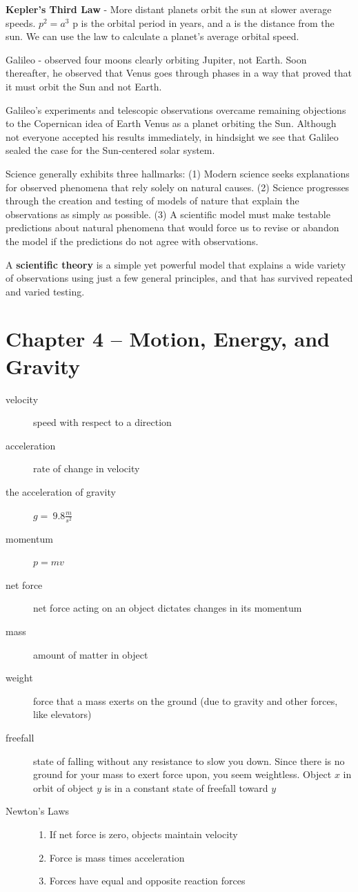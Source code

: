 \documentclass[12pt]{article}
\begin{document}
{\bf Kepler's Third Law} - More distant planets orbit the sun at slower average speeds. {\bf $p^2 = a^3$} p is the orbital period in years, and a is the distance from the sun. We can use the law to calculate a planet’s average orbital speed.

Galileo - observed four moons clearly orbiting Jupiter, not Earth. Soon thereafter, he observed that Venus goes through phases in a way that proved that it must orbit the Sun and not Earth.

Galileo’s experiments and telescopic observations overcame remaining objections to the Copernican idea of Earth
Venus as a planet orbiting the Sun. Although not everyone accepted his results immediately, in hindsight we see that
Galileo sealed the case for the Sun-centered solar system.

Science generally exhibits three hallmarks: (1) Modern science seeks explanations for observed phenomena that rely solely on natural causes. (2) Science progresses through the creation and testing of models of nature that explain the observations as simply as possible. (3) A scientific model must make testable predictions about natural phenomena that would force us to revise or abandon the model if the predictions do not agree with observations.

A {\bf scientific theory} is a simple yet powerful model that explains a wide variety of observations using just a few
general principles, and that has survived repeated and varied testing.

\section{Chapter 4 -- Motion, Energy, and Gravity}
\begin{description}
\item[velocity] speed with respect to a direction
\item[acceleration] rate of change in velocity
\item[the acceleration of gravity] $g = ~9.8 \frac{m}{s^2}$
\item[momentum] $p = mv$
\item[net force] net force acting on an object dictates changes in its momentum
\item[mass] amount of matter in object
\item[weight] force that a mass exerts on the ground (due to gravity and other forces, like elevators)
\item[freefall] state of falling without any resistance to slow you down. Since there is no ground for your mass to exert force upon, you seem weightless. Object $x$ in orbit of object $y$ is in a constant state of freefall toward $y$
\item[Newton's Laws]
\begin{enumerate}
\item If net force is zero, objects maintain velocity
\item Force is mass times acceleration
\item Forces have equal and opposite reaction forces
\end{enumerate}
\end{description}
\end{document}
